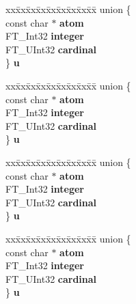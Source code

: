 \begin{DoxyCompactItemize}
\begin{tabbing}
\end{tabbing}\item 
\mbox{\label{structBDF__PropertyRec___a2968d8c4abce4573510c44499ece8775}} 
\begin{tabbing}
xx\=xx\=xx\=xx\=xx\=xx\=xx\=xx\=xx\=\kill
union \{\\
\>const char $\ast$ {\bfseries atom}\\
\>FT\_Int32 {\bfseries integer}\\
\>FT\_UInt32 {\bfseries cardinal}\\
\} {\bfseries u}\\

\end{tabbing}\item 
\mbox{\label{structBDF__PropertyRec___a05dde5baddd361b9adc9fb9913755488}} 
\begin{tabbing}
xx\=xx\=xx\=xx\=xx\=xx\=xx\=xx\=xx\=\kill
union \{\\
\>const char $\ast$ {\bfseries atom}\\
\>FT\_Int32 {\bfseries integer}\\
\>FT\_UInt32 {\bfseries cardinal}\\
\} {\bfseries u}\\

\end{tabbing}\item 
\mbox{\label{structBDF__PropertyRec___ab0c4f494eb5d6baf40e8ee7012fee28f}} 
\begin{tabbing}
xx\=xx\=xx\=xx\=xx\=xx\=xx\=xx\=xx\=\kill
union \{\\
\>const char $\ast$ {\bfseries atom}\\
\>FT\_Int32 {\bfseries integer}\\
\>FT\_UInt32 {\bfseries cardinal}\\
\} {\bfseries u}\\

\end{tabbing}\item 
\mbox{\label{structBDF__PropertyRec___ad5709c93edc2d2ca1c5501465837167d}} 
\begin{tabbing}
xx\=xx\=xx\=xx\=xx\=xx\=xx\=xx\=xx\=\kill
union \{\\
\>const char $\ast$ {\bfseries atom}\\
\>FT\_Int32 {\bfseries integer}\\
\>FT\_UInt32 {\bfseries cardinal}\\
\} {\bfseries u}\\


\end{tabbing}
\end{DoxyCompactItemize}
